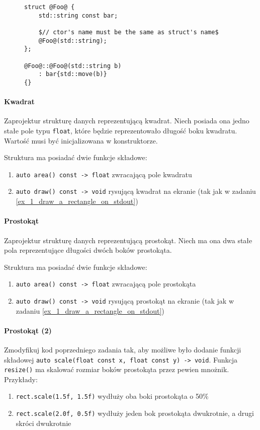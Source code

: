 \documentclass[11pt,a4paper,titlepage,onecolumn]{article}
\begin{document}
\begin{figure}[!htp]
{\small
\begin{lstlisting}[caption={konstruktor},
    captionpos=b,
    label=listing_0011_ctor]
struct @Foo@ {
    std::string const bar;

    $// ctor's name must be the same as struct's name$
    @Foo@(std::string);
};

@Foo@::@Foo@(std::string b)
    : bar{std::move(b)}
{}
\end{lstlisting}}
\end{figure}

\paragraph{Kwadrat} Zaprojektur strukturę danych reprezentującą kwadrat. Niech
posiada ona jedno stałe pole typu \texttt{float}, które będzie reprezentowało
długość boku kwadratu. Wartość musi być inicjalizowana w konstruktorze.

Struktura ma posiadać dwie funkcje składowe:
\begin{enumerate}
    \item \texttt{auto area() const -> float} zwracającą pole kwadratu
    \item \texttt{auto draw() const -> void} rysującą kwadrat na ekranie (tak
        jak w zadaniu \ref{ex_1_draw_a_rectangle_on_stdout})
\end{enumerate}

\paragraph{Prostokąt} Zaprojektur strukturę danych reprezentującą prostokąt.
Niech ma ona dwa stałe pola reprezentujące długości dwóch boków prostokąta.

Struktura ma posiadać dwie funkcje składowe:
\begin{enumerate}
    \item \texttt{auto area() const -> float} zwracającą pole prostokąta
    \item \texttt{auto draw() const -> void} rysującą prostokąt na ekranie (tak
        jak w zadaniu \ref{ex_1_draw_a_rectangle_on_stdout})
\end{enumerate}

\paragraph{Prostokąt (2)} Zmodyfikuj kod poprzedniego zadania tak, aby możliwe
było dodanie funkcji składowej \texttt{auto scale(float const x, float const y) -> void}.
Funkcja \texttt{resize()} ma skalować rozmiar boków prostokąta przez pewien
mnożnik.\\
Przykłady:
\begin{enumerate}
    \item \texttt{rect.scale(1.5f, 1.5f)} wydłuży oba boki prostokąta o 50\%
    \item \texttt{rect.scale(2.0f, 0.5f)} wydłuży jeden bok prostokąta
        dwukrotnie, a drugi skróci dwukrotnie
\end{enumerate}
\end{document}
